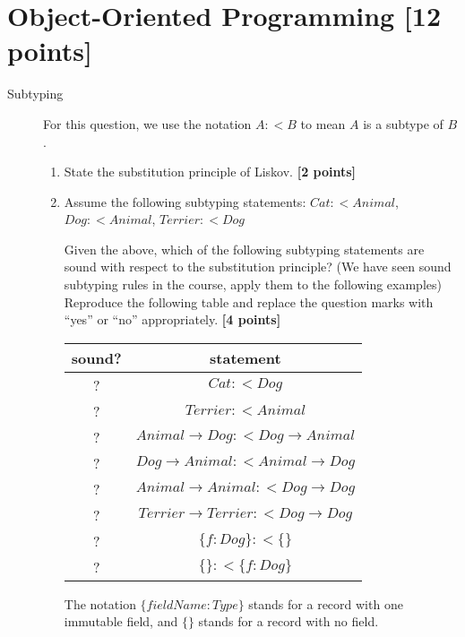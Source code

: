 \documentclass{article}
\begin{document}
\newpage
\section{Object-Oriented Programming [12 points]}

\begin{description}

\item[Subtyping]
  For this question, we use the notation $A :< B$ to mean $A$ is a
  subtype of $B$.

\begin{enumerate}
\item State the substitution principle of Liskov.  \hfill{\textbf{[2
      points]}}

\item Assume the following subtyping statements:
$Cat :< Animal$, $Dog :< Animal$, $Terrier :< Dog$

Given the above, which of the following subtyping statements are
sound with respect to the substitution principle? (We have seen
sound subtyping rules in the course, apply them to the following
examples) Reproduce the following table and replace the question marks with
``yes'' or ``no'' appropriately.
\hfill{\textbf{[4 points]}}

\newcommand{\mutable}{\mathbf{mutable}}
\newcommand{\constant}{\mathbf{constant}}

\begin{center}
\begin{tabular}{cc}
sound?
 & statement
\\
\hline
?
 & $Cat :< Dog$
\\
?
 & $Terrier :< Animal$
\\
?
 & $Animal → Dog :< Dog → Animal$
\\
?
 & $Dog → Animal :< Animal → Dog$
\\
?
 & $Animal → Animal :< Dog → Dog$
\\
?
 & $Terrier → Terrier :< Dog → Dog$
\\
?
 & $\{ f : Dog \} :< \{ \}$
\\
?
 & $\{ \} :< \{ f : Dog \}$
\\
\end{tabular}
\end{center}

The notation $\{ fieldName : Type \}$ stands for a record with one
immutable field, and $\{ \}$ stands for a record with no field.


\end{enumerate}


\end{description}
\end{document}
